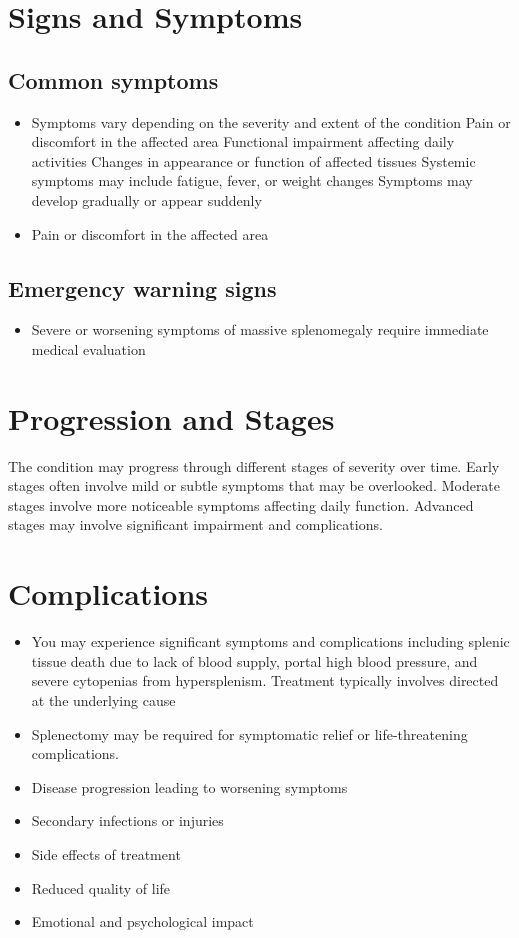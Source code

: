 \section{Signs and Symptoms}

\subsection{Common symptoms}
\begin{itemize}[noitemsep]
  \item Symptoms vary depending on the severity and extent of the condition Pain or discomfort in the affected area Functional impairment affecting daily activities Changes in appearance or function of affected tissues Systemic symptoms may include fatigue, fever, or weight changes Symptoms may develop gradually or appear suddenly
  \item Pain or discomfort in the affected area
  \end{itemize}

\subsection{Emergency warning signs}
\begin{itemize}[noitemsep]
  \item Severe or worsening symptoms of massive splenomegaly require immediate medical evaluation
\end{itemize}
\section{Progression and Stages}
The condition may progress through different stages of severity over time. Early stages often involve mild or subtle symptoms that may be overlooked. Moderate stages involve more noticeable symptoms affecting daily function. Advanced stages may involve significant impairment and complications.
\section{Complications}
\begin{itemize}[noitemsep]
  \item You may experience significant symptoms and complications including splenic tissue death due to lack of blood supply, portal high blood pressure, and severe cytopenias from hypersplenism. Treatment typically involves directed at the underlying cause
  \item Splenectomy may be required for symptomatic relief or life-threatening complications.
  \item Disease progression leading to worsening symptoms
  \item Secondary infections or injuries
  \item Side effects of treatment
  \item Reduced quality of life
  \item Emotional and psychological impact
\end{itemize}
